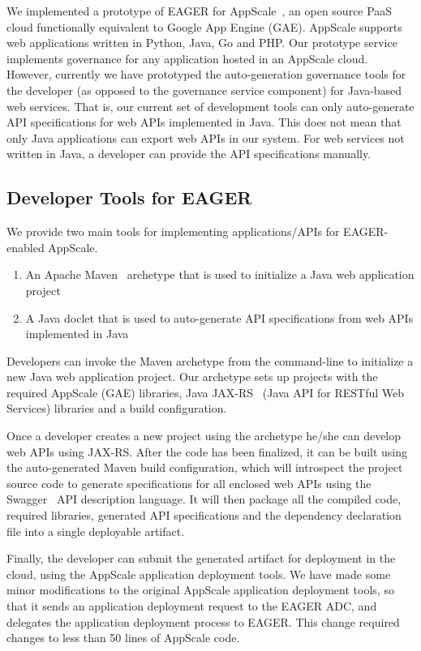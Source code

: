 We implemented a prototype of EAGER for AppScale~\cite{XXXappscaleXXX}, 
an open source PaaS cloud
functionally equivalent to Google App Engine (GAE).  AppScale supports
web applications written in Python, Java, Go and PHP. Our prototype service
implements governance for any application hosted in an AppScale cloud. 
However,
currently we have prototyped the auto-generation governance tools for the
developer (as opposed to the
governance service component) for Java-based web services.
That is, our current set of development tools can only auto-generate API
specifications for web APIs implemented in Java. This does not mean that only
Java applications can export web APIs in our system. For web services not
written in Java, a developer can
provide the API specifications manually.

\subsection{Developer Tools for EAGER}
We provide two main tools for implementing applications/APIs for EAGER-enabled AppScale.
\begin{enumerate}
\item An Apache Maven~\cite{XXXMavenXXX} archetype that is used to initialize a Java web application project
\item A Java doclet that is used to auto-generate API specifications from web APIs implemented in Java
\end{enumerate}

Developers can invoke the Maven archetype from the command-line to initialize
a new Java web application project. Our archetype sets up projects with the
required AppScale (GAE) libraries, Java JAX-RS~\cite{XXXjaxrsXXX} (Java API for RESTful Web
Services) libraries and a build configuration.

Once a developer creates a new project using the archetype he/she can develop
web APIs using JAX-RS. After the code has been finalized, it can be built
using the auto-generated Maven build configuration, which will introspect the
project source code to generate specifications for all enclosed web APIs using
the Swagger~\cite{XXXswaggerXXX} API description language. 
It will then package all the compiled
code, required libraries, generated API specifications and the dependency
declaration file into a single deployable artifact.

Finally, the developer can submit the generated artifact for deployment in the
cloud, using the AppScale application deployment tools. We have made some
minor modifications to the original AppScale application deployment tools, so
that it sends an application deployment request to the EAGER ADC, and
delegates the application deployment process to EAGER. This change required
changes to less than 50 lines of AppScale code.

